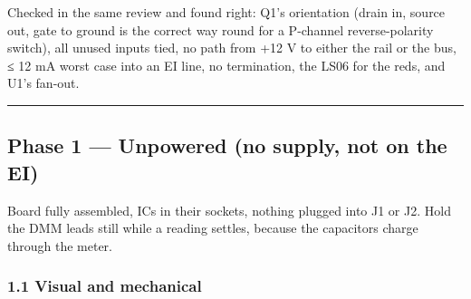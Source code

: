 \documentclass[
  10pt,
]{article}
\begin{document}
Checked in the same review and found right: Q1's orientation
(drain in, source out, gate to ground is the correct way
round for a P-channel reverse-polarity switch), all unused
inputs tied, no path from +12 V to either the rail or the
bus, ≤ 12 mA worst case into an EI line, no termination, the
LS06 for the reds, and U1's fan-out.

\begin{center}\rule{0.5\linewidth}{0.5pt}\end{center}

\clearpage
\hypertarget{phase-1-unpowered-no-supply-not-on-the-ei}{%
\subsection{Phase 1 --- Unpowered (no supply, not on the
EI)}\label{phase-1-unpowered-no-supply-not-on-the-ei}}

Board fully assembled, ICs in their sockets, nothing plugged
into J1 or J2. Hold the DMM leads still while a reading
settles, because the capacitors charge through the meter.

\hypertarget{visual-and-mechanical}{%
\subsubsection{1.1 Visual and
mechanical}\label{visual-and-mechanical}}
\end{document}

